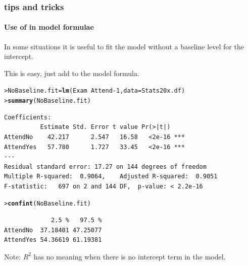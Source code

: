 \documentclass{beamer}\usepackage[]{graphicx}\usepackage[]{xcolor}
\makeatletter
\newcommand{\hlnum}[1]{\textcolor[rgb]{0.686,0.059,0.569}{#1}}%
\newcommand{\hlopt}[1]{\textcolor[rgb]{0,0,0}{#1}}%
\newcommand{\hlstd}[1]{\textcolor[rgb]{0.345,0.345,0.345}{#1}}%
\newcommand{\hlkwb}[1]{\textcolor[rgb]{0.69,0.353,0.396}{#1}}%
\newcommand{\hlkwc}[1]{\textcolor[rgb]{0.333,0.667,0.333}{#1}}%
\newcommand{\hlkwd}[1]{\textcolor[rgb]{0.737,0.353,0.396}{\textbf{#1}}}%
\newenvironment{kframe}{%
 \def\at@end@of@kframe{}%
 \ifinner\ifhmode%
  \def\at@end@of@kframe{\end{minipage}}%
  \begin{minipage}{\columnwidth}%
 \fi\fi%
 \def\FrameCommand##1{\hskip\@totalleftmargin \hskip-\fboxsep
 \colorbox{shadecolor}{##1}\hskip-\fboxsep
     \hskip-\linewidth \hskip-\@totalleftmargin \hskip\columnwidth}%
 \MakeFramed {\advance\hsize-\width
   \@totalleftmargin\z@ \linewidth\hsize
   \@setminipage}}%
 {\par\unskip\endMakeFramed%
 \at@end@of@kframe}
\newenvironment{knitrout}{}{} %
\makeatother
\begin{document}
\begin{frame}[fragile]
\frametitle{ tips and tricks}
\framesubtitle{Use of  in model formulae}

In some situations it is useful to fit the model without a baseline level for the intercept.

\smallskip

This is easy, just add  to the model formula.

\begin{knitrout}\scriptsize
{}\color{fgcolor}\begin{kframe}
\begin{alltt}
\hlstd{> }\hlstd{NoBaseline.fit}\hlkwb{=}\hlkwd{lm}\hlstd{(Exam}\hlopt{~} \hlstd{Attend}\hlopt{-}\hlnum{1}\hlstd{,} \hlkwc{data} \hlstd{= Stats20x.df)}
\hlstd{> }\hlkwd{summary}\hlstd{(NoBaseline.fit)}
\end{alltt}
\end{kframe}
\end{knitrout}

\begin{knitrout}\scriptsize
{}\color{fgcolor}\begin{kframe}
\begin{verbatim}
Coefficients:
          Estimate Std. Error t value Pr(>|t|)    
AttendNo    42.217      2.547   16.58   <2e-16 ***
AttendYes   57.780      1.727   33.45   <2e-16 ***
---
Residual standard error: 17.27 on 144 degrees of freedom
Multiple R-squared:  0.9064,	Adjusted R-squared:  0.9051 
F-statistic:   697 on 2 and 144 DF,  p-value: < 2.2e-16
\end{verbatim}
\begin{alltt}
\hlstd{> }\hlkwd{confint}\hlstd{(NoBaseline.fit)}
\end{alltt}
\begin{verbatim}
             2.5 %   97.5 %
AttendNo  37.18401 47.25077
AttendYes 54.36619 61.19381
\end{verbatim}
\end{kframe}
\end{knitrout}
Note: $R^2$ has no meaning when there is no intercept term in the model.
\end{frame}
\end{document}
